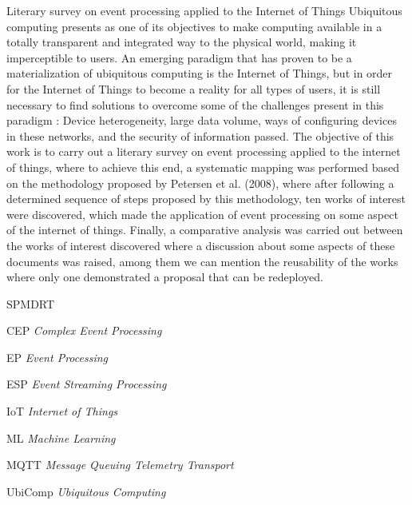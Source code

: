 \documentclass[ti,table]{texufpel} %
\begin{document}
  

\begin{englishabstract}%
{Literary survey on event processing applied to the Internet of Things} 
Ubiquitous computing presents as one of its objectives to make computing available in a totally transparent and integrated way to the physical world, making it imperceptible to users. An emerging paradigm that has proven to be a materialization of ubiquitous computing is the Internet of Things, but in order for the Internet of Things to become a reality for all types of users, it is still necessary to find solutions to overcome some of the challenges present in this paradigm : Device heterogeneity, large data volume, ways of configuring devices in these networks, and the security of information passed. The objective of this work is to carry out a literary survey on event processing applied to the internet of things, where to achieve this end, a systematic mapping was performed based on the methodology proposed by Petersen et al. (2008), where after following a determined sequence of steps proposed by this methodology, ten works of interest were discovered, which made the application of event processing on some aspect of the internet of things. Finally, a comparative analysis was carried out between the works of interest discovered where a discussion about some aspects of these documents was raised, among them we can mention the reusability of the works where only one demonstrated a proposal that can be redeployed. 

\end{englishabstract} 

  


\listoffigures 

  



  


\begin{listofabbrv}{SPMDRT} 

    \item[CEP] \textit{Complex Event Processing}   
    
    \item[EP] \textit{Event Processing} 
    
    \item[ESP] \textit{Event Streaming Processing} 
    
    \item[IoT] \textit{Internet of Things} 
    
    \item[ML] \textit{Machine Learning} 
    
    \item[MQTT] \textit{Message Queuing Telemetry Transport} 

    \item[UbiComp] \textit{Ubiquitous Computing} 
         

\end{listofabbrv} 
\end{document}
